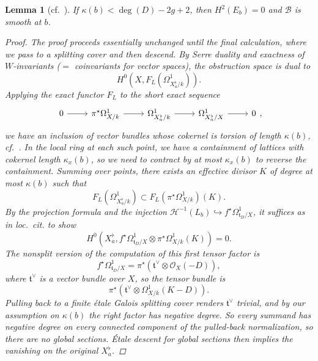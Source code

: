 \documentclass[openany]{amsbook}
\newtheorem{lemma}[theorem]{Lemma}
\theoremstyle{definition}
\theoremstyle{remark}
\numberwithin{equation}{section}
\renewcommand{\O}{\mathcal{O}}
\newcommand{\cH}{\mathcal{H}}
\newcommand{\cB}{\mathcal{B}}
\renewcommand{\-}{\operatorname{-}}
\newcommand{\ft}{\mathfrak{t}}
\begin{document}
\begin{lemma}[{cf.\ \cite[Lemme 9.8.1]{CLII}}]
    If $\kappa(b) < \deg(D) - 2g + 2$, then $H^2(E_b) = 0$ and $\cB$ is smooth at $b$.
    \begin{proof}
        The proof proceeds essentially unchanged until the final calculation, where we pass to a splitting cover and then descend. By Serre duality and exactness of $W$-invariants ($=$ coinvariants for vector spaces), the obstruction space is dual to 
        $$
            H^0(X, F_L(\Omega^1_{X_a^\flat/k})).
        $$
        Applying the exact functor $F_L$ to the short exact sequence
        $$
            \begin{tikzcd}[ampersand replacement=\&]
                0 \ar[r] \& \pi^\star \Omega^1_{X/k} \ar[r] \& \Omega^1_{X_a^\flat/k} \ar[r] \& \Omega^1_{X_a^\flat/X} \ar[r] \& 0
            \end{tikzcd},
        $$
        we have an inclusion of vector bundles whose cokernel is torsion of length $\kappa(b)$, cf.\ \cite[Remarque 9.7.3]{CLII}.
        In the local ring at each such point, we have a containment of lattices with cokernel length $\kappa_x(b)$, so we need to contract by at most $\kappa_x(b)$ to reverse the containment. Summing over points, there exists an effective divisor $K$ of degree at most $\kappa(b)$ such that 
        $$
            F_L(\Omega^1_{X_a^\flat/k}) \subset F_L(\pi^\star \Omega^1_{X/k})(K).
        $$
        By the projection formula and the injection $\cH^{-1}(L_b) \hookrightarrow f^\star \Omega^1_{\ft_D/X}$, it suffices as in \textit{loc.\ cit.} to show
        $$
            H^0(X_a^\flat, f^\star \Omega^1_{\ft_D/X} \otimes \pi^\star \Omega^1_{X/k}(K)) = 0.
        $$
        The nonsplit version of the computation of this first tensor factor is
        $$
            f^\star \Omega^1_{\ft_D/X} = \pi^\star(\ft^\vee \otimes \O_X(-D)),
        $$
        where $\ft^\vee$ is a vector bundle over $X$, so the tensor bundle is 
        $$
            \pi^\star(\ft^\vee \otimes \Omega^1_{X/k}(K - D)).
        $$
        Pulling back to a finite \'etale Galois splitting cover renders $\ft^\vee$ trivial, and by our assumption on $\kappa(b)$ the right factor has negative degree. So every summand has negative degree on every connected component of the pulled-back normalization, so there are no global sections. \'Etale descent for global sections then implies the vanishing on the original $X_a^\flat$.
    \end{proof}
\end{lemma}
\end{document}
